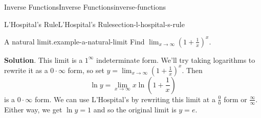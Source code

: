 \documentclass[oneside,10pt,]{book}
\numberwithin{equation}{section}
\begin{document}
\begin{chapterptx}{Inverse Functions}{}{Inverse Functions}{}{}{inverse-functions}
\begin{sectionptx}{L'Hospital's Rule}{}{L'Hospital's Rule}{}{}{section-l-hospital-s-rule}
\begin{example}{A natural limit.}{example-a-natural-limit}
\hypertarget{p-306}{}%
Find \(\lim_{x\to\infty}\left(1+\frac{1}{x}\right)^{x}\).%
\par\smallskip%
\noindent\textbf{Solution}.\hypertarget{solution-69}{}\quad%
\hypertarget{p-307}{}%
This limit is a \(1^{\infty}\) indeterminate form. We'll try taking logarithms to rewrite it as a \(0\cdot\infty\) form, so set \(y = \lim_{x\to\infty}\left(1+\frac{1}{x}\right)^{x}\). Then%
\begin{equation*}
\ln y = \lim_{x\to\infty}x\ln\left(1+\frac{1}{x}\right)
\end{equation*}
is a \(0\cdot\infty\) form. We can use L'Hospital's by rewriting this limit at a \(\frac{0}{0}\) form or \(\frac{\infty}{\infty}\). Either way, we get \(\ln y = 1\) and so the original limit is \(y = e\).%
\end{example}
\end{sectionptx}
\end{chapterptx}
%
%
\typeout{************************************************}
\typeout{************************************************}
%
\end{document}
